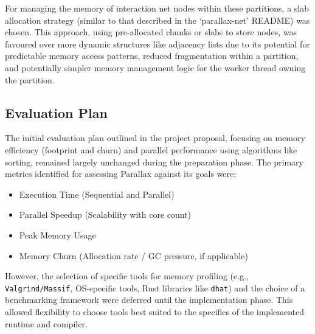 For managing the memory of interaction net nodes within these partitions, a slab allocation strategy (similar to that described in the `parallax-net' README) was chosen. This approach, using pre-allocated chunks or slabs to store nodes, was favoured over more dynamic structures like adjacency lists due to its potential for predictable memory access patterns, reduced fragmentation within a partition, and potentially simpler memory management logic for the worker thread owning the partition.


\subsection{Evaluation Plan}
The initial evaluation plan outlined in the project proposal, focusing on memory efficiency (footprint and churn) and parallel performance using algorithms like sorting, remained largely unchanged during the preparation phase. The primary metrics identified for assessing Parallax against its goals were:
\begin{itemize}
    \item Execution Time (Sequential and Parallel)
    \item Parallel Speedup (Scalability with core count)
    \item Peak Memory Usage
    \item Memory Churn (Allocation rate / GC pressure, if applicable)
\end{itemize}
However, the selection of specific tools for memory profiling (e.g., \texttt{Valgrind/Massif}, OS-specific tools, Rust libraries like \texttt{dhat}) and the choice of a benchmarking framework were deferred until the implementation phase. This allowed flexibility to choose tools best suited to the specifics of the implemented runtime and compiler.

